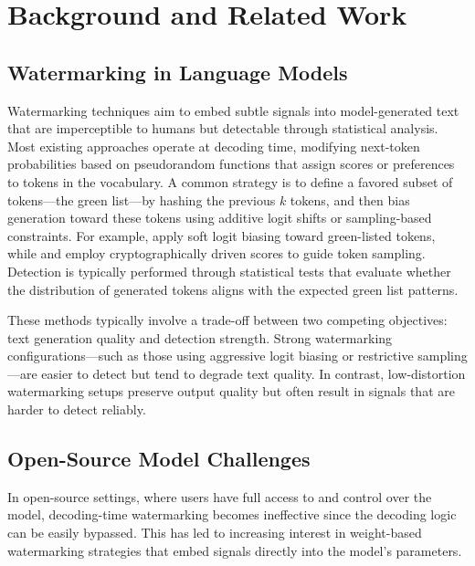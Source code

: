 \section{Background and Related Work}
\label{sec:background_related}

\subsection{Watermarking in Language Models}

Watermarking techniques aim to embed subtle signals into model-generated text that are imperceptible to humans but detectable through statistical analysis. Most existing approaches operate at decoding time, modifying next-token probabilities based on pseudorandom functions that assign scores or preferences to tokens in the vocabulary. A common strategy is to define a favored subset of tokens—the green list—by hashing the previous \(k\) tokens, and then bias generation toward these tokens using additive logit shifts or sampling-based constraints. For example, \citet{kirchenbauer2023watermark} apply soft logit biasing toward green-listed tokens, while \citet{aaronson2023reform} and \citet{kuditipudi2023robust} employ cryptographically driven scores to guide token sampling. Detection is typically performed through statistical tests that evaluate whether the distribution of generated tokens aligns with the expected green list patterns.

These methods typically involve a trade-off between two competing objectives: text generation quality and detection strength. Strong watermarking configurations—such as those using aggressive logit biasing or restrictive sampling—are easier to detect but tend to degrade text quality. In contrast, low-distortion watermarking setups preserve output quality but often result in signals that are harder to detect reliably.

\subsection{Open-Source Model Challenges}

In open-source settings, where users have full access to and control over the model, decoding-time watermarking becomes ineffective since the decoding logic can be easily bypassed. This has led to increasing interest in weight-based watermarking strategies that embed signals directly into the model's parameters.

